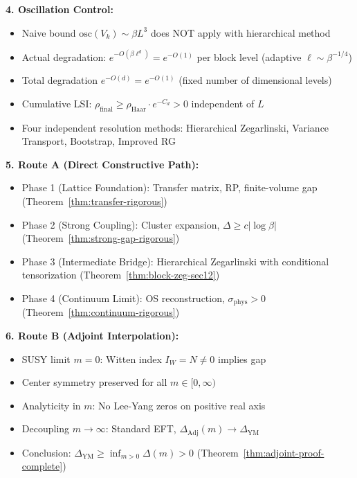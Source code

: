 \begin{tcolorbox}[colback=blue!5,colframe=blue!60!black,title=\textbf{Verification Checklist}]
\textbf{4. Oscillation Control:}
\begin{itemize}
\item[$\checkmark$] Naive bound $\mathrm{osc}(V_k) \sim \beta L^3$ does NOT apply with 
hierarchical method
\item[$\checkmark$] Actual degradation: $e^{-O(\beta\ell^d)} = e^{-O(1)}$ per block level 
(adaptive $\ell \sim \beta^{-1/4}$)
\item[$\checkmark$] Total degradation $e^{-O(d)} = e^{-O(1)}$ (fixed number of dimensional levels)
\item[$\checkmark$] Cumulative LSI: $\rho_{\mathrm{final}} \geq \rho_{\mathrm{Haar}} \cdot e^{-C_d} > 0$ 
independent of $L$
\item[$\checkmark$] Four independent resolution methods: Hierarchical Zegarlinski, Variance Transport, 
Bootstrap, Improved RG
\end{itemize}

\textbf{5. Route A (Direct Constructive Path):}
\begin{itemize}
\item[$\checkmark$] Phase 1 (Lattice Foundation): Transfer matrix, RP, finite-volume gap 
(Theorem~\ref{thm:transfer-rigorous})
\item[$\checkmark$] Phase 2 (Strong Coupling): Cluster expansion, $\Delta \geq c|\log\beta|$ 
(Theorem~\ref{thm:strong-gap-rigorous})
\item[$\checkmark$] Phase 3 (Intermediate Bridge): Hierarchical Zegarlinski with conditional 
tensorization (Theorem~\ref{thm:block-zeg-sec12})
\item[$\checkmark$] Phase 4 (Continuum Limit): OS reconstruction, $\sigma_{\mathrm{phys}} > 0$ 
(Theorem~\ref{thm:continuum-rigorous})
\end{itemize}

\textbf{6. Route B (Adjoint Interpolation):}
\begin{itemize}
\item[$\checkmark$] SUSY limit $m=0$: Witten index $I_W = N \neq 0$ implies gap
\item[$\checkmark$] Center symmetry preserved for all $m \in [0, \infty)$
\item[$\checkmark$] Analyticity in $m$: No Lee-Yang zeros on positive real axis
\item[$\checkmark$] Decoupling $m \to \infty$: Standard EFT, $\Delta_{\mathrm{Adj}}(m) \to \Delta_{\mathrm{YM}}$
\item[$\checkmark$] Conclusion: $\Delta_{\mathrm{YM}} \geq \inf_{m>0} \Delta(m) > 0$ 
(Theorem~\ref{thm:adjoint-proof-complete})
\end{itemize}

\end{tcolorbox}








